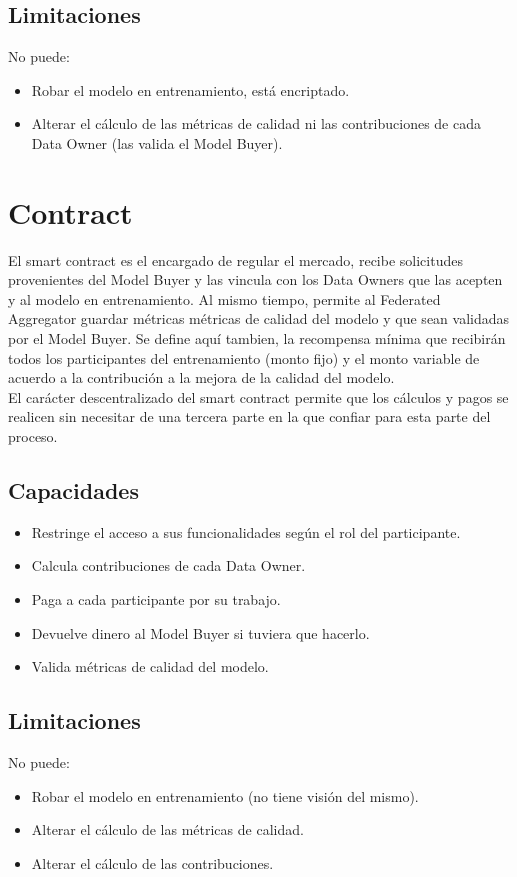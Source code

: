 \documentclass[
11pt, %
oneside, %
spanish, %
singlespacing, %
parskip, %
headsepline, %
chapterinoneline, %
]{MastersDoctoralThesis} %
\begin{document}
\subsection*{Limitaciones}
No puede:
\begin{itemize}
\item Robar el modelo en entrenamiento, está encriptado.
\item Alterar el cálculo de las métricas de calidad ni las contribuciones de cada Data Owner (las valida el Model Buyer).
\end{itemize}


\section{Contract}
El smart contract es el encargado de regular el mercado, recibe solicitudes provenientes del Model Buyer y las vincula con los Data Owners que las acepten y al modelo en entrenamiento. Al mismo tiempo, permite al Federated Aggregator guardar métricas métricas de calidad del modelo y que sean validadas por el Model Buyer.
Se define aquí tambien, la recompensa mínima que recibirán todos los participantes del entrenamiento (monto fijo) y el monto variable de acuerdo a la contribución a la mejora de la calidad del modelo. \\
El carácter descentralizado del smart contract permite que los cálculos y pagos se realicen sin necesitar de una tercera parte en la que confiar para esta parte del proceso.


\subsection*{Capacidades}
\begin{itemize}
\item Restringe el acceso a sus funcionalidades según el rol del participante.
\item Calcula contribuciones de cada Data Owner.
\item Paga a cada participante por su trabajo.
\item Devuelve dinero al Model Buyer si tuviera que hacerlo.
\item Valida métricas de calidad del modelo.
\end{itemize}

\subsection*{Limitaciones}
No puede:
\begin{itemize}
\item Robar el modelo en entrenamiento (no tiene visión del mismo).
\item Alterar el cálculo de las métricas de calidad.
\item Alterar el cálculo de las contribuciones.
\end{itemize}
\end{document}
